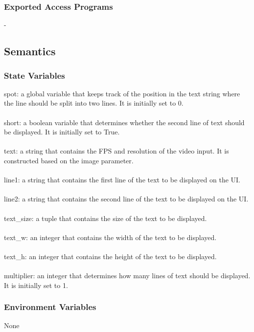\documentclass[12pt, titlepage]{article}
\begin{document}
\subsubsection{Exported Access Programs}
-

\subsection{Semantics}

\subsubsection{State Variables}

spot: a global variable that keeps track of the position in the text string where the line should be split into two lines. It is initially set to 0.\\
\\
short: a boolean variable that determines whether the second line of text should be displayed. It is initially set to True.\\
\\
text: a string that contains the FPS and resolution of the video input. It is constructed based on the image parameter.\\
\\
line1: a string that contains the first line of the text to be displayed on the UI.\\
\\
line2: a string that contains the second line of the text to be displayed on the UI.\\
\\
text\_size: a tuple that contains the size of the text to be displayed.\\
\\
text\_w: an integer that contains the width of the text to be displayed.\\
\\
text\_h: an integer that contains the height of the text to be displayed.\\
\\
multiplier: an integer that determines how many lines of text should be displayed. It is initially set to 1.\\

\subsubsection{Environment Variables}

None\\
\end{document}
